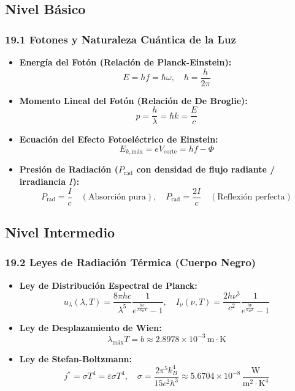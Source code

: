 \documentclass[11pt,a4paper]{article}
\begin{document}
\subsection*{Nivel Básico}

\subsubsection*{19.1 Fotones y Naturaleza Cuántica de la Luz}

\begin{itemize}
  \item \textbf{Energía del Fotón (Relación de Planck-Einstein):}
  \[
    E = h f = \hbar \omega, \quad \hbar = \frac{h}{2\pi}
  \]
  \item \textbf{Momento Lineal del Fotón (Relación de De Broglie):}
  \[
    p = \frac{h}{\lambda} = \hbar k = \frac{E}{c}
  \]
  \item \textbf{Ecuación del Efecto Fotoeléctrico de Einstein:}
  \[
    E_{k,\text{máx}} = e V_{\text{corte}} = h f - \Phi
  \]
  \item \textbf{Presión de Radiación ($P_{\text{rad}}$ con densidad de flujo radiante / irradiancia $I$):}
  \[
    P_{\text{rad}} = \frac{I}{c} \quad (\text{Absorción pura}), \quad P_{\text{rad}} = \frac{2I}{c} \quad (\text{Reflexión perfecta})
  \]
\end{itemize}

\subsection*{Nivel Intermedio}

\subsubsection*{19.2 Leyes de Radiación Térmica (Cuerpo Negro)}

\begin{itemize}
  \item \textbf{Ley de Distribución Espectral de Planck:}
  \[
    u_\lambda(\lambda, T) = \frac{8\pi h c}{\lambda^5} \frac{1}{e^{\frac{h c}{\lambda k_B T}} - 1}, \quad I_\nu(\nu, T) = \frac{2h\nu^3}{c^2}\frac{1}{e^{\frac{h\nu}{k_B T}} - 1}
  \]
  \item \textbf{Ley de Desplazamiento de Wien:}
  \[
    \lambda_{\text{máx}} T = b \approx 2.8978 \times 10^{-3} \, \text{m}\cdot\text{K}
  \]
  \item \textbf{Ley de Stefan-Boltzmann:}
  \[
    j^* = \sigma T^4 = \varepsilon \sigma T^4, \quad \sigma = \frac{2\pi^5 k_B^4}{15 c^2 h^3} \approx 5.6704 \times 10^{-8} \, \frac{\text{W}}{\text{m}^2\cdot\text{K}^4}
  \]
\end{itemize}
\end{document}
